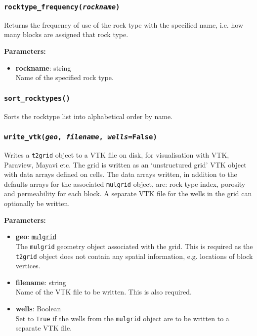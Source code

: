 \begin{snugshade}
\subsubsection{\texttt{rocktype\_frequency(\emph{rockname})}}
\end{snugshade}
\label{sec:t2grid:rocktype_frequency}

Returns the frequency of use of the rock type with the specified name, i.e. how many blocks are assigned that rock type.

\textbf{Parameters:}
\begin{itemize}
\item \textbf{rockname}: string\\
  Name of the specified rock type.
\end{itemize}

\begin{snugshade}
\subsubsection{\texttt{sort\_rocktypes()}}
\end{snugshade}
\label{sec:t2grid:sort_rocktypes}

Sorts the rocktype list into alphabetical order by name.

\begin{snugshade}
\subsubsection{\texttt{write\_vtk(\emph{geo}, \emph{filename}, \emph{wells}=False)}}
\end{snugshade}
\label{sec:t2grid:write_vtk}

Writes a \texttt{t2grid} object to a VTK file on disk, for visualisation with VTK, Paraview, Mayavi etc.  The grid is written as an `unstructured grid' VTK object with data arrays defined on cells.  The data arrays written, in addition to the defaults arrays for the associated \texttt{mulgrid} object, are: rock type index, porosity and permeability for each block.  A separate VTK file for the wells in the grid can optionally be written.

\textbf{Parameters:}
\begin{itemize}
\item \textbf{geo}: \hyperref[mulgrids]{\texttt{mulgrid}}\\
  The \texttt{mulgrid} geometry object associated with the grid.  This is required as the \texttt{t2grid} object does not contain any spatial information, e.g. locations of block vertices.
\item \textbf{filename}: string\\
  Name of the VTK file to be written.  This is also required.
\item \textbf{wells}: Boolean\\
  Set to \texttt{True} if the wells from the \texttt{mulgrid} object are to be written to a separate VTK file.
\end{itemize}

